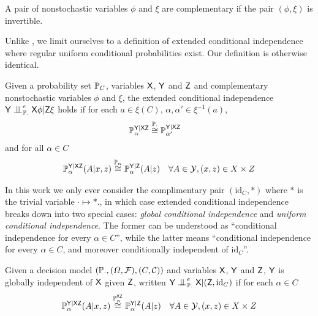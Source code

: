 \begin{definition}\label{def:comp_var}
A pair of nonstochastic variables $\phi$ and $\xi$ are complementary if the pair $(\phi,\xi)$ is invertible.
\end{definition}

Unlike \citet{constantinou_extended_2017}, we limit ourselves to a definition of extended conditional independence where regular uniform conditional probabilities exist. Our definition is otherwise identical.

\begin{definition}\label{def:eci_orig}
Given a probability set $\mathbb{P}_C$, variables $\mathsf{X}$, $\mathsf{Y}$ and $\mathsf{Z}$ and complementary nonstochastic variables $\phi$ and $\xi$, the extended conditional independence $\RV{Y}\CI^e_{\prob{P}_\cdot} \RV{X} \phi|\RV{Z} \xi$ holds if for each $a\in \xi(C)$, $\alpha,\alpha'\in \xi^{-1}(a)$,
\begin{align}
    \mathbb{P}_{\alpha}^{\mathsf{Y}|\mathsf{XZ}} &\overset{\mathbb{P}_{\cdot}}{\cong} \mathbb{P}_{\alpha'}^{\mathsf{Y}|\mathsf{XZ}}
\end{align}
and for all $\alpha\in C$
\begin{align}
    \mathbb{P}_{\alpha}^{\mathsf{Y}|\mathsf{XZ}}(A|x,z) &\overset{\mathbb{P}_{\alpha}}{\cong} \mathbb{P}_{\alpha}^{\mathsf{Y}|\mathsf{Z}}(A|z)&\forall A\in \mathcal{Y},(x,z)\in X\times Z\label{eq:eci}
\end{align}
\end{definition}

In this work we only ever consider the complimentary pair $(\mathrm{id}_C,*)$ where $*$ is the trivial variable $\cdot \mapsto *$., in which case extended conditional independence breaks down into two special cases: \emph{global conditional independence} and \emph{uniform conditional independence}. The former can be understood as ``conditional independence for every $\alpha\in C$'', while the latter means ``conditional independence for every $\alpha\in C$, and moreover conditionally independent of $\mathrm{id}_C$''.

\begin{definition}\label{def:eci_glob}
Given a decision model $(\mathbb{P}_\cdot, (\Omega,\mathcal{F}), (C,\mathcal{C}))$ and variables $\mathsf{X}$, $\mathsf{Y}$ and $\mathsf{Z}$, $\mathsf{Y}$ is globally independent of $\mathsf{X}$ given $\mathsf{Z}$, written $\RV{Y}\CI^e_{\prob{P}_\cdot} \RV{X} |(\RV{Z}, \mathrm{id}_C)$ if for each $\alpha\in C$
\begin{align}
    \mathbb{P}_{\alpha}^{\mathsf{Y}|\mathsf{XZ}}(A|x,z) &\overset{\mathbb{P}_{\alpha}^{\mathsf{XZ}}}{\cong} \mathbb{P}_{\alpha}^{\mathsf{Y}|\mathsf{Z}}(A|z)&\forall A\in \mathcal{Y},(x,z)\in X\times Z\label{eq:gci}
\end{align}
\end{definition}

